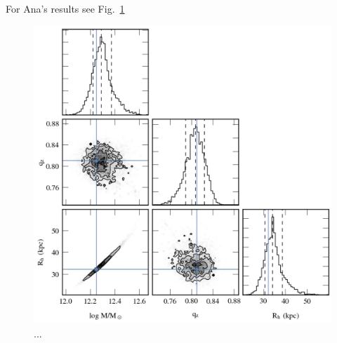 For Ana's results see Fig.~\ref{plot_ana_results}
\begin{figure}
\includegraphics[width=168mm]{./figures/ana_results.png}
  \caption{...}
  \label{plot_ana_results}
\end{figure}

